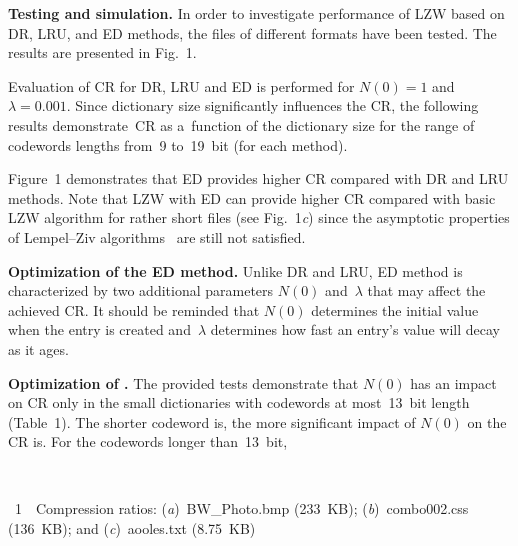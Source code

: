 \begin{multicols}{2}
\noindent
\textbf{Testing and simulation.} 
In order to investigate performance of {LZW} based on {DR}, 
{LRU}, and {ED} methods, the files of different formats have been tested. 
The results are presented in Fig.~1.


Evaluation of CR for DR, LRU and ED is performed for 
$N(0)=1$ and $\lambda=0.001$.
Since dictionary size significantly influences the CR, the 
following results demonstrate~CR as a~function of the dictionary size for the 
range of codewords lengths from~9 to~19~bit (for each method).





Figure~1 demonstrates that ED provides higher 
CR compared with DR and LRU methods.
Note that LZW with ED can provide higher CR compared 
with basic LZW algorithm for rather short
files (see Fig.~1\textit{c}) since the asymptotic properties of Lempel--Ziv 
algorithms~\cite{ZL77, Z09} are still not satisfied. 


\noindent
\textbf{Optimization of the ED method.} 
Unlike DR and LRU, ED method is characterized by two additional parameters $N(0)$ 
and~$\lambda$ that may affect the achieved CR. It should be reminded 
that $N(0)$ determines the initial value when the entry is created and~$\lambda$ 
 determines how fast an entry's value will decay as it ages.

\noindent
\textbf{Optimization of {}.}
The provided tests demonstrate that $N(0)$ has an impact on CR
only in the small dictionaries with codewords at most~13~bit 
length (Table~1). The shorter codeword is, the more significant impact of $N(0)$ 
 on the CR is. For the codewords longer than~13~bit,\linebreak\vspace*{-12pt}
 
 \pagebreak
 
 \noindent
 \begin{center}  %
\vspace*{-8pt}
\mbox{%
 \epsfxsize=74.365mm
 }

\end{center}


\noindent
{{\figurename~1}\ \ \small{Compression ratios: (\textit{a})~BW\_Photo.bmp (233~KB);
(\textit{b})~combo002.css (136~KB);
and (\textit{c})~aooles.txt (8.75~KB)}}
 
 \vspace*{19pt}
 

\end{multicols}
